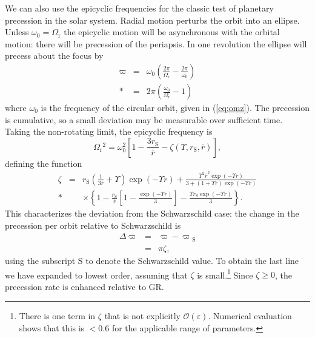 \documentclass[aps,prd,amsfonts,amssymb,amsmath,nofootinbib,reprint,showpacs]{revtex4-1}
\newcommand{\eqnref}[1]{(\ref{eq:#1})}
\newcommand{\sub}[1]{\ensuremath{_\text{#1}}}
\newcommand{\recip}[1]{\ensuremath{\frac{1}{#1}}}
\newcommand{\order}[1]{\ensuremath{\mathcal{O}({#1})}}
\begin{document}
We can also use the epicyclic frequencies for the classic test of planetary precession in the solar system. Radial motion perturbs the orbit into an ellipse. Unless $\omega_0 = \Omega\sub{r}$ the epicyclic motion will be asynchronous with the orbital motion: there will be precession of the periapsis. In one revolution the ellipse will precess about the focus by
\begin{eqnarray}
\varpi & = & \omega_0\left(\frac{2\pi}{\Omega\sub{r}} - \frac{2\pi}{\omega_0}\right) \nonumber \\*
 & = & 2\pi\left(\frac{\omega_0}{\Omega\sub{r}} - 1\right)
\end{eqnarray}
where $\omega_0$ is the frequency of the circular orbit, given in \eqnref{omz}. The precession is cumulative, so a small deviation may be measurable over sufficient time. Taking the non-rotating limit, the epicyclic frequency is
\begin{equation}
\Omega\sub{r}^2 = \omega_0^2 \left[1 - \frac{3r\sub{S}}{\overline{r}} - \zeta(\Upsilon,r\sub{S},\overline{r})\right],
\end{equation}
defining the function
\begin{eqnarray}
\zeta & = & r\sub{S}\left(\recip{3\overline{r}} + \Upsilon\right)\exp(-\Upsilon r) + \frac{\Upsilon^2\overline{r}^2\exp(-\Upsilon r)}{3 + (1 + \Upsilon \overline{r})\exp(-\Upsilon r)} \nonumber \\*
& &  \times \left\{1 - \frac{r\sub{S}}{\overline{r}}\left[1 - \frac{\exp(-\Upsilon r)}{3}\right] - \frac{\Upsilon r\sub{S}\exp(-\Upsilon r)}{3}\right\}.
\end{eqnarray}
This characterizes the deviation from the Schwarzschild case: the change in the precession per orbit relative to Schwarzschild is
\begin{eqnarray}
\Delta \varpi & = & \varpi - \varpi\sub{S} \\
 & = & \pi\zeta,
\end{eqnarray}
using the subscript $\text{S}$ to denote the Schwarzschild value. To obtain the last line we have expanded to lowest order, assuming that $\zeta$ is small.\footnote{There is one term in $\zeta$ that is not explicitly $\order{\varepsilon}$. Numerical evaluation shows that this is $< 0.6$ for the applicable range of parameters.} Since $\zeta \geq 0$, the precession rate is enhanced relative to GR.
\end{document}
